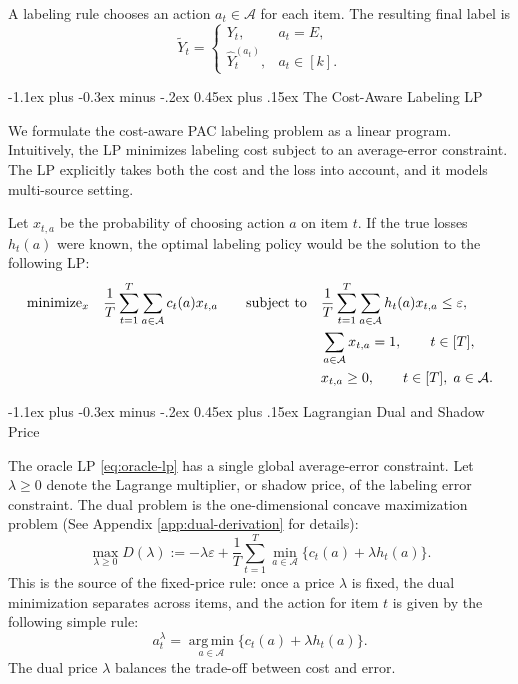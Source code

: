 \documentclass[11pt]{article}
\makeatletter
\renewcommand\subsection{\@startsection{subsection}{2}{\z@}%
  {-1.1ex plus -0.3ex minus -.2ex}%
  {0.45ex plus .15ex}%
  {\normalfont\large\bfseries}}
\newcommand{\calA}{\mathcal{A}}
\newcommand{\hatY}{\widehat Y}
\newcommand{\tildeY}{\widetilde Y}
\newcommand{\eps}{\varepsilon}
\newcommand{\argmin}{\operatorname*{arg\,min}}
\makeatother
\begin{document}

A labeling rule chooses an action $a_t\in\calA$ for each item.
The resulting final label is
\[
    \tildeY_t
    =
    \begin{cases}
        Y_t, & a_t=E,\\
        \hatY_t^{(a_t)}, & a_t\in[k].
    \end{cases}
\]

\subsection{The Cost-Aware Labeling LP}

We formulate the cost-aware PAC labeling problem as a linear program.
Intuitively, the LP minimizes labeling cost subject to an average-error constraint. The LP explicitly takes both the cost and the loss into account, 
and it models multi-source setting.

Let $x_{t,a}$ be the probability of choosing action $a$ on item $t$.
If the true losses $h_t(a)$ were known,
the optimal labeling policy would be the solution to the following LP:
\begin{equation}
\label{eq:oracle-lp}
\begin{aligned}
    \textnormal{minimize}_{x}\quad
    \frac1T\sum_{t=1}^T\sum_{a\in\calA} c_t(a)x_{t,a}
    \qquad
    \textnormal{subject to}\quad
    & \frac1T\sum_{t=1}^T\sum_{a\in\calA} h_t(a)x_{t,a} \le \eps,
    \\
    & \sum_{a\in\calA}x_{t,a}=1,\qquad t\in[T],
    \\
    & x_{t,a}\ge0,\qquad t\in[T],\; a\in\calA.
\end{aligned}
\end{equation}


\subsection{Lagrangian Dual and Shadow Price}

The oracle LP \eqref{eq:oracle-lp} has a single global average-error constraint.
Let $\lambda\ge0$ denote the Lagrange multiplier, or shadow price, of the labeling error constraint.
The dual problem is the one-dimensional concave maximization problem (See Appendix \ref{app:dual-derivation} for details):
\begin{equation}
    \max_{\lambda\ge0}
    D(\lambda)
    :=
    -\lambda\eps
    +
    \frac1T\sum_{t=1}^T
    \min_{a\in\calA}\{c_t(a)+\lambda h_t(a)\}.
    \label{eq:dual-problem}
\end{equation}
This is the source of the fixed-price rule: once a price $\lambda$ is fixed,
the dual minimization separates across items, and the action for item $t$ is given by the following simple rule:
\begin{equation}
    a_t^\lambda
    =
    \argmin_{a\in\calA}
    \{c_t(a)+\lambda h_t(a)\}.
    \label{eq:true-price-action}
\end{equation}
The dual price $\lambda$ balances the trade-off between cost and error.
\end{document}
